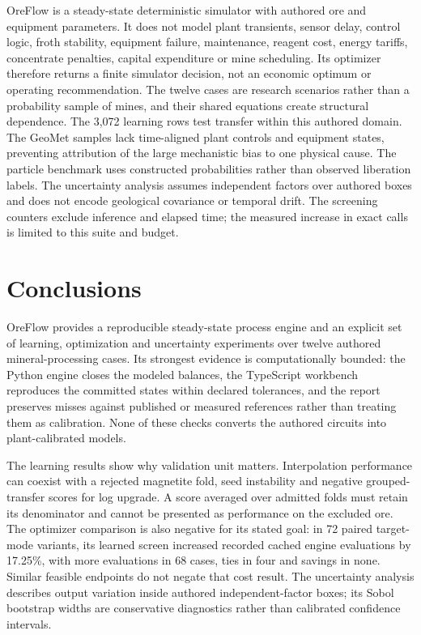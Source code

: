 \documentclass[10pt]{article}
\begin{document}
OreFlow is a steady-state deterministic simulator with authored ore and
equipment parameters. It does not model plant transients, sensor delay,
control logic, froth stability, equipment failure, maintenance, reagent
cost, energy tariffs, concentrate penalties, capital expenditure or mine
scheduling. Its optimizer therefore returns a finite simulator decision,
not an economic optimum or operating recommendation. The twelve cases
are research scenarios rather than a probability sample of mines, and
their shared equations create structural dependence. The 3,072 learning
rows test transfer within this authored domain. The GeoMet samples lack
time-aligned plant controls and equipment states, preventing attribution
of the large mechanistic bias to one physical cause. The particle
benchmark uses constructed probabilities rather than observed liberation
labels. The uncertainty analysis assumes independent factors over
authored boxes and does not encode geological covariance or temporal
drift. The screening counters exclude inference and elapsed time; the
measured increase in exact calls is limited to this suite and budget.

\section{Conclusions}\label{conclusions}

OreFlow provides a reproducible steady-state process engine and an
explicit set of learning, optimization and uncertainty experiments over
twelve authored mineral-processing cases. Its strongest evidence is
computationally bounded: the Python engine closes the modeled balances,
the TypeScript workbench reproduces the committed states within declared
tolerances, and the report preserves misses against published or
measured references rather than treating them as calibration. None of
these checks converts the authored circuits into plant-calibrated
models.

The learning results show why validation unit matters. Interpolation
performance can coexist with a rejected magnetite fold, seed instability
and negative grouped-transfer scores for log upgrade. A score averaged
over admitted folds must retain its denominator and cannot be presented
as performance on the excluded ore. The optimizer comparison is also
negative for its stated goal: in 72 paired target-mode variants, its
learned screen increased recorded cached engine evaluations by 17.25\%,
with more evaluations in 68 cases, ties in four and savings in none.
Similar feasible endpoints do not negate that cost result. The
uncertainty analysis describes output variation inside authored
independent-factor boxes; its Sobol bootstrap widths are conservative
diagnostics rather than calibrated confidence intervals.
\end{document}
